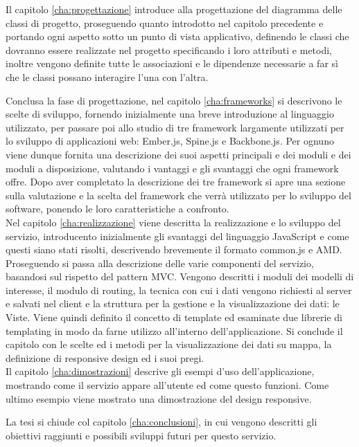 Il capitolo \ref{cha:progettazione} introduce alla progettazione del diagramma delle classi di progetto, proseguendo quanto introdotto nel capitolo precedente e portando ogni aspetto sotto un punto di vista applicativo, definendo le classi che dovranno essere realizzate nel progetto specificando i loro attributi e metodi, inoltre vengono definite tutte le associazioni e le dipendenze necessarie a far sì che le classi possano interagire l'una con l'altra.\\
\newpage

Conclusa la fase di progettazione, nel capitolo \ref{cha:frameworks} si descrivono le scelte di sviluppo, fornendo inizialmente una breve introduzione al linguaggio utilizzato, per passare poi allo studio di tre framework largamente utilizzati per lo sviluppo di applicazioni web: Ember.js, Spine.js e Backbone.js. Per ognuno viene dunque fornita una descrizione dei suoi aspetti principali e dei moduli e dei moduli a disposizione, valutando i vantaggi e gli svantaggi che ogni framework offre. Dopo aver completato la descrizione dei tre framework si apre una sezione sulla valutazione e la scelta del framework che verrà utilizzato per lo sviluppo del software, ponendo le loro caratteristiche a confronto.\\

Nel capitolo \ref{cha:realizzazione} viene descritta la realizzazione e lo sviluppo del servizio, introducento inizialmente gli svantaggi del linguaggio JavaScript e come questi siano stati risolti, descrivendo brevemente il formato common.js e AMD. Proseguendo si passa alla descrizione delle varie componenti del servizio, basandosi sul rispetto del pattern MVC. Vengono descritti i moduli dei modelli di interesse, il modulo di routing, la tecnica con cui i dati vengono richiesti al server e salvati nel client e la struttura per la gestione e la visualizzazione dei dati: le Viste. Viene quindi definito il concetto di template ed esaminate due librerie di templating in modo da farne utilizzo all'interno dell'applicazione. Si conclude il capitolo con le scelte ed i metodi per la visualizzazione dei dati su mappa, la definizione di responsive design ed i suoi pregi.\\

Il capitolo \ref{cha:dimostrazioni} descrive gli esempi d'uso dell'applicazione, mostrando come il servizio appare all'utente ed come questo funzioni. Come ultimo esempio viene mostrato una dimostrazione del design responsive.

La tesi si chiude col capitolo \ref{cha:conclusioni}, in cui vengono descritti gli obiettivi raggiunti e possibili sviluppi futuri per questo servizio.